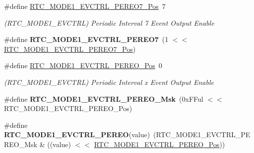 \begin{DoxyCompactItemize}
\item 
\hypertarget{group___s_a_m_l21___r_t_c_gaa41853206da7cff9a83448e7f4a83cb5}{}\#define \hyperlink{group___s_a_m_l21___r_t_c_gaa41853206da7cff9a83448e7f4a83cb5}{R\+T\+C\+\_\+\+M\+O\+D\+E1\+\_\+\+E\+V\+C\+T\+R\+L\+\_\+\+P\+E\+R\+E\+O7\+\_\+\+Pos}~7\label{group___s_a_m_l21___r_t_c_gaa41853206da7cff9a83448e7f4a83cb5}

\begin{DoxyCompactList}\small\item\em (R\+T\+C\+\_\+\+M\+O\+D\+E1\+\_\+\+E\+V\+C\+T\+R\+L) Periodic Interval 7 Event Output Enable \end{DoxyCompactList}\item 
\hypertarget{group___s_a_m_l21___r_t_c_ga19200f59b0805f3a6ca4a7301d6e22fb}{}\#define {\bfseries R\+T\+C\+\_\+\+M\+O\+D\+E1\+\_\+\+E\+V\+C\+T\+R\+L\+\_\+\+P\+E\+R\+E\+O7}~(1 $<$$<$ \hyperlink{group___s_a_m_l21___r_t_c_gaa41853206da7cff9a83448e7f4a83cb5}{R\+T\+C\+\_\+\+M\+O\+D\+E1\+\_\+\+E\+V\+C\+T\+R\+L\+\_\+\+P\+E\+R\+E\+O7\+\_\+\+Pos})\label{group___s_a_m_l21___r_t_c_ga19200f59b0805f3a6ca4a7301d6e22fb}

\item 
\hypertarget{group___s_a_m_l21___r_t_c_gac494f12bde557de73ca2e699c34f591b}{}\#define \hyperlink{group___s_a_m_l21___r_t_c_gac494f12bde557de73ca2e699c34f591b}{R\+T\+C\+\_\+\+M\+O\+D\+E1\+\_\+\+E\+V\+C\+T\+R\+L\+\_\+\+P\+E\+R\+E\+O\+\_\+\+Pos}~0\label{group___s_a_m_l21___r_t_c_gac494f12bde557de73ca2e699c34f591b}

\begin{DoxyCompactList}\small\item\em (R\+T\+C\+\_\+\+M\+O\+D\+E1\+\_\+\+E\+V\+C\+T\+R\+L) Periodic Interval x Event Output Enable \end{DoxyCompactList}\item 
\hypertarget{group___s_a_m_l21___r_t_c_gafd9c31168ba419c3bcb57a8030980a7f}{}\#define {\bfseries R\+T\+C\+\_\+\+M\+O\+D\+E1\+\_\+\+E\+V\+C\+T\+R\+L\+\_\+\+P\+E\+R\+E\+O\+\_\+\+Msk}~(0x\+F\+Ful $<$$<$ R\+T\+C\+\_\+\+M\+O\+D\+E1\+\_\+\+E\+V\+C\+T\+R\+L\+\_\+\+P\+E\+R\+E\+O\+\_\+\+Pos)\label{group___s_a_m_l21___r_t_c_gafd9c31168ba419c3bcb57a8030980a7f}

\item 
\hypertarget{group___s_a_m_l21___r_t_c_ga5ad3e2ed86885658547d84535e10e4fd}{}\#define {\bfseries R\+T\+C\+\_\+\+M\+O\+D\+E1\+\_\+\+E\+V\+C\+T\+R\+L\+\_\+\+P\+E\+R\+E\+O}(value)~(R\+T\+C\+\_\+\+M\+O\+D\+E1\+\_\+\+E\+V\+C\+T\+R\+L\+\_\+\+P\+E\+R\+E\+O\+\_\+\+Msk \& ((value) $<$$<$ \hyperlink{group___s_a_m_l21___r_t_c_gac494f12bde557de73ca2e699c34f591b}{R\+T\+C\+\_\+\+M\+O\+D\+E1\+\_\+\+E\+V\+C\+T\+R\+L\+\_\+\+P\+E\+R\+E\+O\+\_\+\+Pos}))\label{group___s_a_m_l21___r_t_c_ga5ad3e2ed86885658547d84535e10e4fd}


\end{DoxyCompactItemize}
